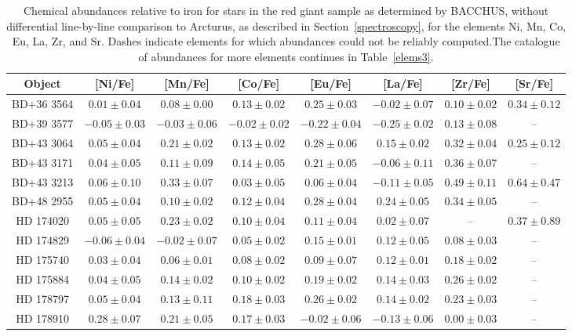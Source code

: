 \begin{table*}
\caption{Chemical abundances relative to iron for stars in the red giant sample as determined by BACCHUS, without differential line-by-line comparison to Arcturus, as described in Section~\ref{spectroscopy}, for the elements Ni, Mn, Co, Eu, La, Zr, and Sr. Dashes indicate elements for which abundances could not be reliably computed.The catalogue of abundances for more elements continues in Table~\ref{elems3}.\label{elems2}}
\begin{tabular}{cccccccc}
\hline \hline
Object & [Ni/Fe] & [Mn/Fe] & [Co/Fe] & [Eu/Fe] & [La/Fe] & [Zr/Fe] & [Sr/Fe] \\
\hline
BD+36 3564 & $0.01 \pm 0.04$ & $0.08 \pm 0.00$ & $0.13 \pm 0.02$ & $0.25 \pm 0.03$ & $-0.02 \pm 0.07$ & $0.10 \pm 0.02$ & $0.34 \pm 0.12$ \\
BD+39 3577 & $-0.05 \pm 0.03$ & $-0.03 \pm 0.06$ & $-0.02 \pm 0.02$ & $-0.22 \pm 0.04$ & $-0.25 \pm 0.02$ & $0.13 \pm 0.08$ & -- \\
BD+43 3064 & $0.05 \pm 0.04$ & $0.21 \pm 0.02$ & $0.13 \pm 0.02$ & $0.28 \pm 0.06$ & $0.15 \pm 0.02$ & $0.32 \pm 0.04$ & $0.25 \pm 0.12$ \\
BD+43 3171 & $0.04 \pm 0.05$ & $0.11 \pm 0.09$ & $0.14 \pm 0.05$ & $0.21 \pm 0.05$ & $-0.06 \pm 0.11$ & $0.36 \pm 0.07$ & -- \\
BD+43 3213 & $0.06 \pm 0.10$ & $0.33 \pm 0.07$ & $0.03 \pm 0.05$ & $0.06 \pm 0.04$ & $-0.11 \pm 0.05$ & $0.49 \pm 0.11$ & $0.64 \pm 0.47$ \\
BD+48 2955 & $0.05 \pm 0.04$ & $0.10 \pm 0.02$ & $0.12 \pm 0.04$ & $0.28 \pm 0.04$ & $0.24 \pm 0.05$ & $0.34 \pm 0.05$ & -- \\
HD 174020 & $0.05 \pm 0.05$ & $0.23 \pm 0.02$ & $0.10 \pm 0.04$ & $0.11 \pm 0.04$ & $0.02 \pm 0.07$ & -- & $0.37 \pm 0.89$ \\
HD 174829 & $-0.06 \pm 0.04$ & $-0.02 \pm 0.07$ & $0.05 \pm 0.02$ & $0.15 \pm 0.01$ & $0.12 \pm 0.05$ & $0.08 \pm 0.03$ & -- \\
HD 175740 & $0.03 \pm 0.04$ & $0.06 \pm 0.01$ & $0.08 \pm 0.02$ & $0.09 \pm 0.07$ & $0.12 \pm 0.01$ & $0.18 \pm 0.02$ & -- \\
HD 175884 & $0.04 \pm 0.05$ & $0.14 \pm 0.02$ & $0.10 \pm 0.02$ & $0.19 \pm 0.02$ & $0.14 \pm 0.03$ & $0.26 \pm 0.02$ & -- \\
HD 178797 & $0.05 \pm 0.04$ & $0.13 \pm 0.11$ & $0.18 \pm 0.03$ & $0.26 \pm 0.02$ & $0.14 \pm 0.02$ & $0.23 \pm 0.03$ & -- \\
HD 178910 & $0.28 \pm 0.07$ & $0.21 \pm 0.05$ & $0.17 \pm 0.03$ & $-0.02 \pm 0.06$ & $-0.13 \pm 0.06$ & $0.00 \pm 0.03$ & -- \\

\end{tabular}
\end{table*}
